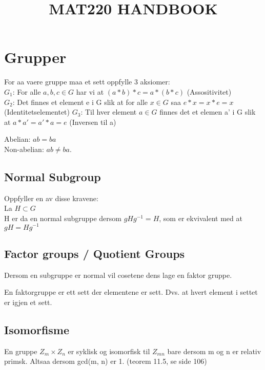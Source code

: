 \documentclass[12pt,a4paper]{article}
\title{MAT220 HANDBOOK}
\begin{document}
%

\maketitle

\section*{Grupper}
For aa vaere gruppe maa et sett oppfylle 3 aksiomer:\\
$G_1$: For alle $a,b,c \in G$ har vi at $(a*b)*c = a*(b*c)$ (Assositivitet)\\
$G_2$: Det finnes et element e i G slik at for alle $x \in G$ saa $e*x = x*e = x$ (Identitetselementet)
$G_3$: Til hver element $a \in G$ finnes det et elemen a' i G slik at $a*a' = a'*a = e$ (Inversen til a)

Abelian: $ab = ba$\\
Non-abelian: $ab \neq ba$.

\subsection*{Normal Subgroup}
Oppfyller en av disse kravene:\\
La $H \subset G$\\
H er da en normal subgruppe dersom $gHg^{-1} = H$, som er ekvivalent med at\\
$gH = Hg^{-1}$

\subsection*{Factor groups / Quotient Groups}
Dersom en subgruppe er normal vil cosetene dens lage en faktor gruppe. 

En faktorgruppe er ett sett der elementene er sett. Dvs. at hvert element i settet er igjen et sett.

\subsection*{Isomorfisme}
En gruppe $ Z_{m} \times Z_{n} $ er syklisk og isomorfisk til $ Z_{mn} $ bare dersom m og n er relativ primsk.
Altsaa dersom gcd(m, n) er 1. (teorem 11.5, se side 106)\\
\end{document}
